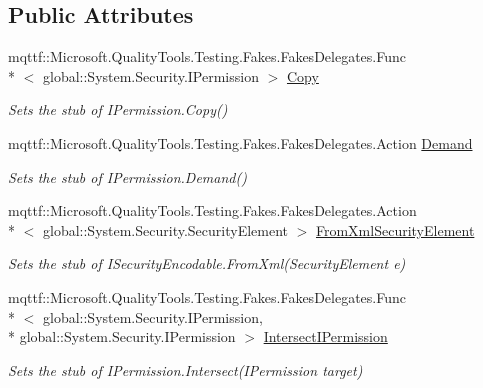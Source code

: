 \subsection*{Public Attributes}
\begin{DoxyCompactItemize}
\item 
mqttf\-::\-Microsoft.\-Quality\-Tools.\-Testing.\-Fakes.\-Fakes\-Delegates.\-Func\\*
$<$ global\-::\-System.\-Security.\-I\-Permission $>$ \hyperlink{class_system_1_1_security_1_1_fakes_1_1_stub_i_permission_a4349639984e01960070556dfb46e57a9}{Copy}
\begin{DoxyCompactList}\small\item\em Sets the stub of I\-Permission.\-Copy()\end{DoxyCompactList}\item 
mqttf\-::\-Microsoft.\-Quality\-Tools.\-Testing.\-Fakes.\-Fakes\-Delegates.\-Action \hyperlink{class_system_1_1_security_1_1_fakes_1_1_stub_i_permission_a48f9f315bca8285098ad707b782ed64d}{Demand}
\begin{DoxyCompactList}\small\item\em Sets the stub of I\-Permission.\-Demand()\end{DoxyCompactList}\item 
mqttf\-::\-Microsoft.\-Quality\-Tools.\-Testing.\-Fakes.\-Fakes\-Delegates.\-Action\\*
$<$ global\-::\-System.\-Security.\-Security\-Element $>$ \hyperlink{class_system_1_1_security_1_1_fakes_1_1_stub_i_permission_a129835596b70a0090eb8933fd4ebcd14}{From\-Xml\-Security\-Element}
\begin{DoxyCompactList}\small\item\em Sets the stub of I\-Security\-Encodable.\-From\-Xml(\-Security\-Element e)\end{DoxyCompactList}\item 
mqttf\-::\-Microsoft.\-Quality\-Tools.\-Testing.\-Fakes.\-Fakes\-Delegates.\-Func\\*
$<$ global\-::\-System.\-Security.\-I\-Permission, \\*
global\-::\-System.\-Security.\-I\-Permission $>$ \hyperlink{class_system_1_1_security_1_1_fakes_1_1_stub_i_permission_a1bdfb225517f22278e4fd70df138e967}{Intersect\-I\-Permission}
\begin{DoxyCompactList}\small\item\em Sets the stub of I\-Permission.\-Intersect(\-I\-Permission target)\end{DoxyCompactList}\item 

\end{DoxyCompactItemize}
